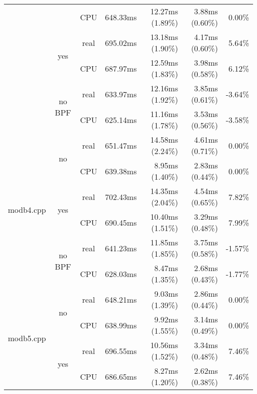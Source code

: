 \documentclass[en]{pracamgr}
\begin{document}
\begin{appendices}
\begin{small}
\begin{longtable}{|l|c|c|r|r|r|r|}
                            &                         & CPU  & 648.33ms & 12.27ms (1.89\%) & 3.88ms (0.60\%) & 0.00\% \\*
                            \cline{2-7}
                            & \multirow{2}{*}{yes}    & real & 695.02ms & 13.18ms (1.90\%) & 4.17ms (0.60\%) & 5.64\% \\*
                            &                         & CPU  & 687.97ms & 12.59ms (1.83\%) & 3.98ms (0.58\%) & 6.12\% \\*
                            \cline{2-7}
                            & \multirow{2}{*}{no BPF} & real & 633.97ms & 12.16ms (1.92\%) & 3.85ms (0.61\%) & -3.64\% \\*
                            &                         & CPU  & 625.14ms & 11.16ms (1.78\%) & 3.53ms (0.56\%) & -3.58\% \\
\hline
\multirow{6}{*}{modb4.cpp}  & \multirow{2}{*}{no}     & real & 651.47ms & 14.58ms (2.24\%) & 4.61ms (0.71\%) & 0.00\% \\*
                            &                         & CPU  & 639.38ms & 8.95ms (1.40\%) & 2.83ms (0.44\%) & 0.00\% \\*
                            \cline{2-7}
                            & \multirow{2}{*}{yes}    & real & 702.43ms & 14.35ms (2.04\%) & 4.54ms (0.65\%) & 7.82\% \\*
                            &                         & CPU  & 690.45ms & 10.40ms (1.51\%) & 3.29ms (0.48\%) & 7.99\% \\*
                            \cline{2-7}
                            & \multirow{2}{*}{no BPF} & real & 641.23ms & 11.85ms (1.85\%) & 3.75ms (0.58\%) & -1.57\% \\*
                            &                         & CPU  & 628.03ms & 8.47ms (1.35\%) & 2.68ms (0.43\%) & -1.77\% \\
\hline
\multirow{6}{*}{modb5.cpp}  & \multirow{2}{*}{no}     & real & 648.21ms & 9.03ms (1.39\%) & 2.86ms (0.44\%) & 0.00\% \\*
                            &                         & CPU  & 638.99ms & 9.92ms (1.55\%) & 3.14ms (0.49\%) & 0.00\% \\*
                            \cline{2-7}
                            & \multirow{2}{*}{yes}    & real & 696.55ms & 10.56ms (1.52\%) & 3.34ms (0.48\%) & 7.46\% \\*
                            &                         & CPU  & 686.65ms & 8.27ms (1.20\%) & 2.62ms (0.38\%) & 7.46\% \\*

\end{longtable}
\end{small}
\end{appendices}
\end{document}
